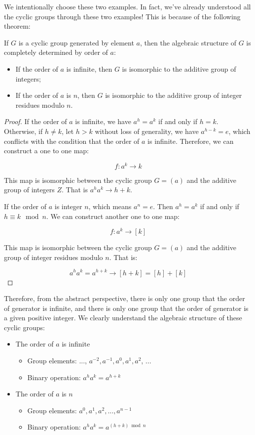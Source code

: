 \documentclass{article}
\begin{document}
We intentionally choose these two examples. In fact, we've already understood all the cyclic groups through these two examples! This is because of the following theorem:

\begin{theorem}
If $G$ is a cyclic group generated by element $a$, then the algebraic structure of $G$ is completely determined by order of $a$:
\begin{itemize}
\item If the order of $a$ is infinite, then $G$ is isomorphic to the additive group of integers;
\item If the order of $a$ is $n$, then $G$ is isomorphic to the additive group of integer residues modulo $n$.
\end{itemize}
\end{theorem}

\begin{proof}
If the order of $a$ is infinite, we have $a^h = a^k$ if and only if $h = k$. Otherwise, if $h \neq k$, let $h > k$ without loss of generality, we have $a^{h - k} = e$, which conflicts with the condition that the order of $a$ is infinite. Therefore, we can construct a one to one map:

\[
f: a^k \to k
\]

This map is isomorphic between the cyclic group $G = (a)$ and the additive group of integers $Z$. That is $a^ha^k \to h + k$.

If the order of $a$ is integer $n$, which means $a^n = e$. Then $a^h = a^k$ if and only if $h \equiv k \mod n$. We can construct another one to one map:

\[
f: a^k \to [k]
\]

This map is isomorphic between the cyclic group $G = (a)$ and the additive group of integer residues modulo $n$. That is:

\[
a^ha^k = a^{h + k} \to [h + k] = [h] + [k]
\]
\end{proof}

Therefore, from the abstract perspective, there is only one group that the order of generator is infinite, and there is only one group that the order of generator is a given positive integer. We clearly understand the algebraic structure of these cyclic groups:

\begin{itemize}
\item The order of $a$ is infinite
  \begin{itemize}
  \item Group elements: ..., $a^{-2}, a^{-1}, a^0, a^1, a^2$, ...
  \item Binary operation: $a^ha^k = a^{h + k}$
  \end{itemize}
\item The order of $a$ is $n$
  \begin{itemize}
  \item Group elements: $a^0, a^1, a^2, ..., a^{n-1}$
  \item Binary operation: $a^ha^k = a^{(h + k) \bmod n}$
  \end{itemize}
\end{itemize}
\end{document}
